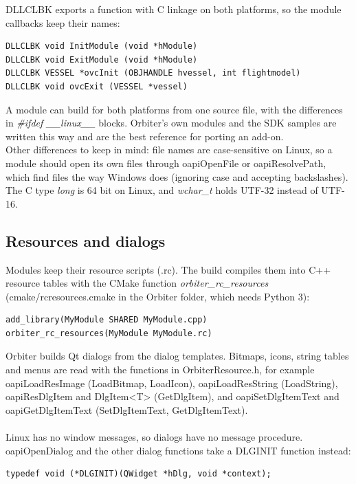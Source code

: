 \documentclass[Orbiter Developer Manual.tex]{subfiles}
\begin{document}
\noindent
DLLCLBK exports a function with C linkage on both platforms, so the module callbacks keep their names:

\begin{lstlisting}
DLLCLBK void InitModule (void *hModule)
DLLCLBK void ExitModule (void *hModule)
DLLCLBK VESSEL *ovcInit (OBJHANDLE hvessel, int flightmodel)
DLLCLBK void ovcExit (VESSEL *vessel)
\end{lstlisting}

\noindent
A module can build for both platforms from one source file, with the differences in \textit{\#ifdef \_\_linux\_\_} blocks. Orbiter's own modules and the SDK samples are written this way and are the best reference for porting an add-on.\\
Other differences to keep in mind: file names are case-sensitive on Linux, so a module should open its own files through oapiOpenFile or oapiResolvePath, which find files the way Windows does (ignoring case and accepting backslashes). The C type \textit{long} is 64 bit on Linux, and \textit{wchar\_t} holds UTF-32 instead of UTF-16.


\subsection{Resources and dialogs}
Modules keep their resource scripts (.rc). The build compiles them into C++ resource tables with the CMake function \textit{orbiter\_rc\_resources} (cmake/rcresources.cmake in the Orbiter folder, which needs Python 3):

\begin{lstlisting}
add_library(MyModule SHARED MyModule.cpp)
orbiter_rc_resources(MyModule MyModule.rc)
\end{lstlisting}

\noindent
Orbiter builds Qt dialogs from the dialog templates. Bitmaps, icons, string tables and menus are read with the functions in OrbiterResource.h, for example oapiLoadResImage (LoadBitmap, LoadIcon), oapiLoadResString (LoadString), oapiResDlgItem and DlgItem<T> (GetDlgItem), and oapiSetDlgItemText and oapiGetDlgItemText (SetDlgItemText, GetDlgItemText).\\
\\
Linux has no window messages, so dialogs have no message procedure. oapiOpenDialog and the other dialog functions take a DLGINIT function instead:

\begin{lstlisting}
typedef void (*DLGINIT)(QWidget *hDlg, void *context);
\end{lstlisting}
\end{document}
